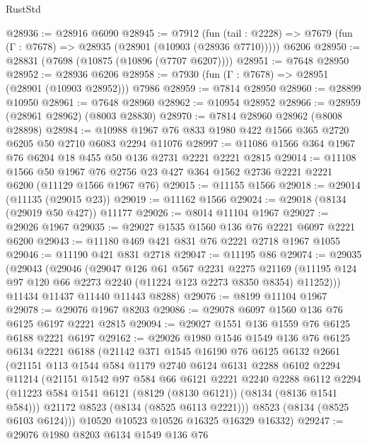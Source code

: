 \begin{lexlean}{RustStd}
\begin{coremodule}
@28936 := @28916 @6090
@28945 := @7912
    (fun (tail : @2228) => @7679 (fun (Γ : @7678) => @28935 (@28901 (@10903 (@28936 @7710)))))
    @6206
@28950 := @28831 (@7698 (@10875 (@10896 (@7707 @6207))))
@28951 := @7648 @28950
@28952 := @28936 @6206
@28958 := @7930 (fun (Γ : @7678) => @28951 (@28901 (@10903 @28952))) @7986
@28959 := @7814 @28950
@28960 := @28899 @10950
@28961 := @7648 @28960
@28962 := @10954 @28952
@28966 := @28959 (@28961 @28962) (@8003 @28830)
@28970 := @7814 @28960 @28962 (@8008 @28898)
@28984 := @10988 @1967 @76 @833 @1980 @422 @1566 @365 @2720 @6205 @50 @2710 @6083 @2294 @11076
@28997 := @11086 @1566 @364 @1967 @76 @6204 @18 @455 @50 @136 @2731 @2221 @2221 @2815
@29014 := @11108
    @1566
    @50
    @1967
    @76
    @2756
    @23
    @427
    @364
    @1562
    @2736
    @2221
    @2221
    @6200
    (@11129 @1566 @1967 @76)
@29015 := @11155 @1566
@29018 := @29014 (@11135 (@29015 @23))
@29019 := @11162 @1566
@29024 := @29018 (@8134 (@29019 @50 @427)) @11177
@29026 := @8014 @11104 @1967
@29027 := @29026 @1967
@29035 := @29027 @1535 @1560 @136 @76 @2221 @6097 @2221 @6200
@29043 := @11180 @469 @421 @831 @76 @2221 @2718 @1967 @1055
@29046 := @11190 @421 @831 @2718
@29047 := @11195 @86
@29074 := @29035
    (@29043
      (@29046
        (@29047
          @126
          @61
          @567
          @2231
          @2275
          @21169
          (@11195 @124 @97 @120 @66 @2273 @2240 (@11224 @123 @2273 @8350 @8354) @11252)))
      @11434
      @11437
      @11440
      @11443
      @8288)
@29076 := @8199 @11104 @1967
@29078 := @29076 @1967 @8203
@29086 := @29078 @6097 @1560 @136 @76 @6125 @6197 @2221 @2815
@29094 := @29027 @1551 @136 @1559 @76 @6125 @6188 @2221 @6197
@29162 := @29026
    @1980
    @1546
    @1549
    @136
    @76
    @6125
    @6134
    @2221
    @6188
    (@21142
      @371
      @1545
      @16190
      @76
      @6125
      @6132
      @2661
      (@21151
        @113
        @1544
        @584
        @1179
        @2740
        @6124
        @6131
        @2288
        @6102
        @2294
        @11214
        (@21151
          @1542
          @97
          @584
          @66
          @6121
          @2221
          @2240
          @2288
          @6112
          @2294
          (@11223 @584 @1541 @6121 (@8129 (@8130 @6121)) (@8134 (@8136 @1541 @584)))
          @21172
          @8523
          (@8134 (@8525 @6113 @2221)))
        @8523
        (@8134 (@8525 @6103 @6124)))
      @10520
      @10523
      @10526
      @16325
      @16329
      @16332)
@29247 := @29076
    @1980
    @8203
    @6134
    @1549
    @136
    @76

\end{coremodule}
\end{lexlean}
